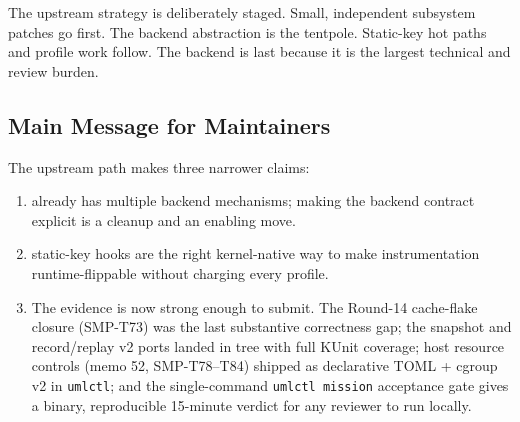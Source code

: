 The upstream strategy is deliberately staged. Small, independent
subsystem patches go first. The backend abstraction is the tentpole.
Static-key hot paths and profile work follow. The \KVM{} backend is
last because it is the largest technical and review burden.

\subsection{Main Message for Maintainers}

The upstream path makes three narrower claims:
\begin{enumerate}
  \item \UML{} already has multiple backend mechanisms; making the
        backend contract explicit is a cleanup and an enabling move.
  \item static-key hooks are the right kernel-native way to make
        instrumentation runtime-flippable without charging every
        profile.
  \item The \KVMvTwo{} evidence is now strong enough to submit. The
        Round-14 cache-flake closure (SMP-T73) was the last
        substantive correctness gap; the snapshot and record/replay
        v2 ports landed in tree with full KUnit coverage; host
        resource controls (memo 52, SMP-T78--T84) shipped as
        declarative TOML + cgroup v2 in \texttt{umlctl}; and the
        single-command \texttt{umlctl mission} acceptance gate
        gives a binary, reproducible 15-minute verdict for any
        reviewer to run locally.
\end{enumerate}
